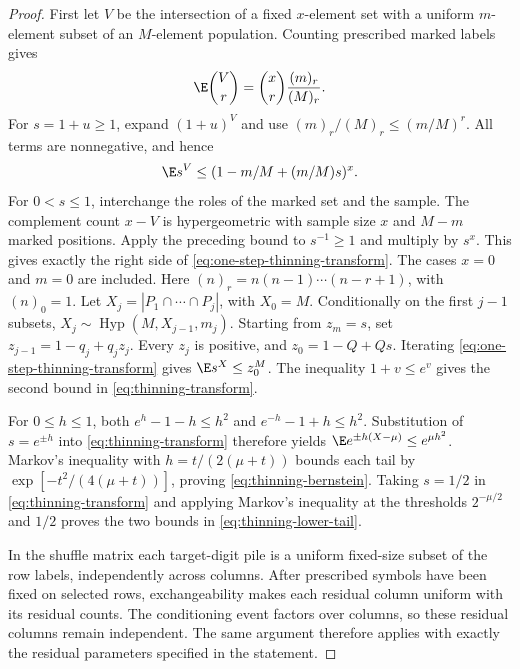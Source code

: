 \begin{proof}
First let $V$ be the intersection of a fixed $x$-element set with a
uniform $m$-element subset of an $M$-element population. Counting prescribed
marked labels gives
\[
 \E\binom Vr=\binom xr\frac{(m)_r}{(M)_r}.
\]
For $s=1+u\ge1$, expand $(1+u)^V$ and use
$(m)_r/(M)_r\le(m/M)^r$. All terms are nonnegative, and hence
\begin{equation}\label{eq:one-step-thinning-transform}
 \E s^V\le(1-m/M+(m/M)s)^x.
\end{equation}
For $0<s\le1$, interchange the roles of the marked set and the sample.
The complement count $x-V$ is hypergeometric with sample size $x$ and
$M-m$ marked positions. Apply the preceding bound to $s^{-1}\ge1$ and
multiply by $s^x$. This gives exactly the right side of
\eqref{eq:one-step-thinning-transform}. The cases $x=0$ and $m=0$ are
included. Here $(n)_r=n(n-1)\cdots(n-r+1)$, with $(n)_0=1$.
Let \(X_j=|P_1\cap\cdots\cap P_j|\), with \(X_0=M\).
Conditionally on the first \(j-1\) subsets,
\(X_j\sim\operatorname{Hyp}(M,X_{j-1},m_j)\).
Starting from \(z_m=s\), set
\(z_{j-1}=1-q_j+q_jz_j\). Every \(z_j\) is positive, and
\(z_0=1-Q+Qs\). Iterating \eqref{eq:one-step-thinning-transform}
gives \(\E s^X\le z_0^M\). The inequality \(1+v\le e^v\)
gives the second bound in \eqref{eq:thinning-transform}.

For \(0\le h\le1\), both
\(e^h-1-h\le h^2\) and \(e^{-h}-1+h\le h^2\).
Substitution of \(s=e^{\pm h}\) into
\eqref{eq:thinning-transform} therefore yields
\(\E e^{\pm h(X-\mu)}\le e^{\mu h^2}\).
Markov's inequality with \(h=t/(2(\mu+t))\) bounds each tail by
\(\exp[-t^2/(4(\mu+t))]\), proving
\eqref{eq:thinning-bernstein}.
Taking \(s=1/2\) in \eqref{eq:thinning-transform} and applying
Markov's inequality at the thresholds \(2^{-\mu/2}\) and \(1/2\)
proves the two bounds in \eqref{eq:thinning-lower-tail}.

In the shuffle matrix each target-digit pile is a uniform fixed-size
subset of the row labels, independently across columns. After prescribed
symbols have been fixed on selected rows, exchangeability makes each
residual column uniform with its residual counts. The conditioning event
factors over columns, so these residual columns remain independent.
The same argument therefore applies with exactly the residual parameters
specified in the statement.
\end{proof}

